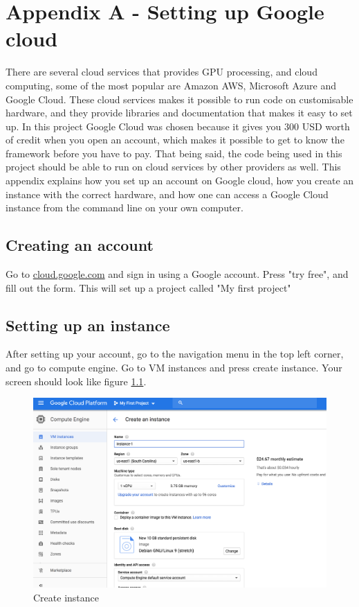 
\chapter{Appendix A - Setting up Google cloud}
\label{ap_gcloud}
There are several cloud services that provides GPU processing, and cloud computing, some of the most popular are Amazon AWS, Microsoft Azure and Google Cloud. These cloud services makes it possible to run code on customisable hardware, and they provide libraries and documentation that makes it easy to set up. In this project Google Cloud was chosen because it gives you 300 USD worth of credit when you open an account, which makes it possible to get to know the framework before you have to pay. That being said, the code being used in this project should be able to run on cloud services by other providers as well. This appendix explains how you set up an account on Google cloud, how you create an instance with the correct hardware, and how one can access a Google Cloud instance from the command line on your own computer. 

\section{Creating an account}
Go to \url{cloud.google.com} and sign in using a Google account. Press "try free", and fill out the form. This will set up a project called "My first project"

\section{Setting up an instance}
After setting up your account, go to the navigation menu in the top left corner, and go to compute engine. Go to VM instances and press create instance. Your screen should look like figure \ref{fig:create_instance1}.

\begin{figure}
    \centering
    \includegraphics[scale=0.35]{images/create_instance1.png}
    \caption{Create instance}
    \label{fig:create_instance1}
\end{figure}

